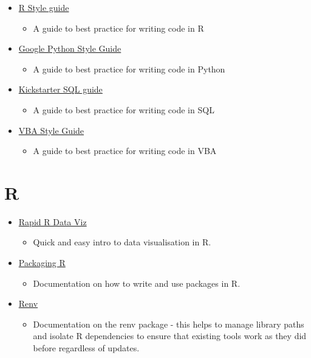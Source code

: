 \documentclass[
]{book}
\providecommand{\tightlist}{%
  \setlength{\itemsep}{0pt}\setlength{\parskip}{0pt}}
\begin{document}
\begin{itemize}
\tightlist
\item
  \href{https://style.tidyverse.org/index.html}{R Style guide}

  \begin{itemize}
  \tightlist
  \item
    A guide to best practice for writing code in R
  \end{itemize}
\item
  \href{https://google.github.io/styleguide/pyguide.html}{Google Python Style Guide}

  \begin{itemize}
  \tightlist
  \item
    A guide to best practice for writing code in Python
  \end{itemize}
\item
  \href{https://gist.github.com/fredbenenson/7bb92718e19138c20591}{Kickstarter SQL guide}

  \begin{itemize}
  \tightlist
  \item
    A guide to best practice for writing code in SQL
  \end{itemize}
\item
  \href{https://github.com/danwagnerco/vba-style-guide}{VBA Style Guide}

  \begin{itemize}
  \tightlist
  \item
    A guide to best practice for writing code in VBA
  \end{itemize}
\end{itemize}

\hypertarget{r}{%
\section{R}\label{r}}

\begin{itemize}
\tightlist
\item
  \href{https://billster45.github.io/rapid_r_data_vis_book/}{Rapid R Data Viz}

  \begin{itemize}
  \tightlist
  \item
    Quick and easy intro to data visualisation in R.
  \end{itemize}
\item
  \href{http://r-pkgs.had.co.nz/}{Packaging R}

  \begin{itemize}
  \tightlist
  \item
    Documentation on how to write and use packages in R.
  \end{itemize}
\item
  \href{https://rstudio.github.io/renv/articles/renv.html}{Renv}

  \begin{itemize}
  \tightlist
  \item
    Documentation on the renv package - this helps to manage library paths and isolate R dependencies to ensure that existing tools work as they did before regardless of updates.
  \end{itemize}
\end{itemize}
\end{document}
